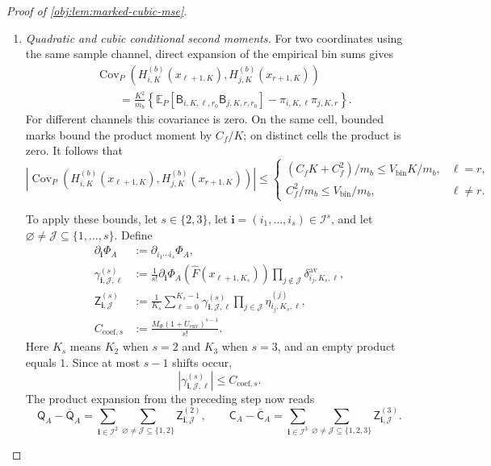 \begin{proof}[Proof of \cref{obj:lem:marked-cubic-mse}]
\begin{enumerate}
\item \textit{Quadratic and cubic conditional second moments.}
For two coordinates using the same sample channel, direct expansion of the empirical bin sums gives
\[
\begin{aligned}
&\operatorname{Cov}_P\!\left(
H_{i,K}^{(b)}(x_{\ell+1,K}),
H_{j,K}^{(b)}(x_{r+1,K})
\right)\\
&\qquad=
\frac{K^2}{m_b}
\left\{
\mathbb E_P[
\mathsf B_{i,K,\ell,r_0}\mathsf B_{j,K,r,r_0}]
-\pi_{i,K,\ell}\pi_{j,K,r}
\right\}.
\end{aligned}
\]
For different channels this covariance is zero. On the same cell, bounded marks bound the product moment by \(C_f/K\); on distinct cells the product is zero. It follows that
\[
\left|
\operatorname{Cov}_P\!\left(
H_{i,K}^{(b)}(x_{\ell+1,K}),
H_{j,K}^{(b)}(x_{r+1,K})
\right)
\right|
\le
\begin{cases}
(C_fK+C_f^2)/m_b\le V_{\mathrm{bin}}K/m_b,
&\ell=r,\\
C_f^2/m_b\le V_{\mathrm{bin}}/m_b,
&\ell\ne r.
\end{cases}
\]

To apply these bounds, let \(s\in\{2,3\}\), let
\(\boldsymbol i=(i_1,\ldots,i_s)\in\mathcal I^s\), and let
\(\varnothing\ne\mathcal J\subseteq\{1,\ldots,s\}\). Define
\[
\begin{aligned}
\partial_{\boldsymbol i}\Phi_A
&:=\partial_{i_1\cdots i_s}\Phi_A,\\
\gamma^{(s)}_{\boldsymbol i,\mathcal J,\ell}
&:=
\frac1{s!}
\partial_{\boldsymbol i}\Phi_A(\widehat F(x_{\ell+1,K_s}))
\prod_{j\notin\mathcal J}
\delta^{\mathrm{av}}_{i_j,K_s,\ell},\\
\mathsf Z^{(s)}_{\boldsymbol i,\mathcal J}
&:=
\frac1{K_s}\sum_{\ell=0}^{K_s-1}
\gamma^{(s)}_{\boldsymbol i,\mathcal J,\ell}
\prod_{j\in\mathcal J}\eta^{(j)}_{i_j,K_s,\ell},\\
C_{\mathrm{coef},s}
&:=\frac{M_\Phi(1+U_{\mathrm{env}})^{s-1}}{s!}.
\end{aligned}
\]
Here \(K_s\) means \(K_2\) when \(s=2\) and \(K_3\) when \(s=3\), and an empty product equals \(1\). Since at most \(s-1\) shifts occur,
\[
|\gamma^{(s)}_{\boldsymbol i,\mathcal J,\ell}|
\le C_{\mathrm{coef},s}.
\]
The product expansion from the preceding step now reads
\[
\mathsf Q_A-\overline{\mathsf Q}_A
=\sum_{\boldsymbol i\in\mathcal I^2}
\sum_{\varnothing\ne\mathcal J\subseteq\{1,2\}}
\mathsf Z^{(2)}_{\boldsymbol i,\mathcal J},
\qquad
\mathsf C_A-\overline{\mathsf C}_A
=\sum_{\boldsymbol i\in\mathcal I^3}
\sum_{\varnothing\ne\mathcal J\subseteq\{1,2,3\}}
\mathsf Z^{(3)}_{\boldsymbol i,\mathcal J}.
\]


\end{enumerate}
\end{proof}
